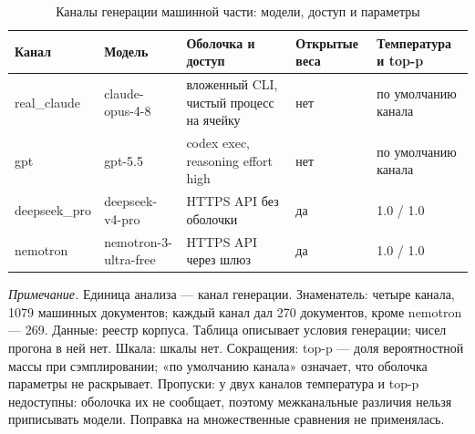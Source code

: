 \begin{table}[htbp]
\centering
\small
\caption{Каналы генерации машинной части: модели, доступ и параметры}
\label{tab:s2}
\begin{tabular}{lllll}
\toprule
Канал & Модель & Оболочка и доступ & Открытые веса & Температура и top-p \\
\midrule
real\_claude & claude-opus-4-8 & вложенный CLI, чистый процесс на ячейку & нет & по умолчанию канала \\
gpt & gpt-5.5 & codex exec, reasoning effort high & нет & по умолчанию канала \\
deepseek\_pro & deepseek-v4-pro & HTTPS API без оболочки & да & 1.0 / 1.0 \\
nemotron & nemotron-3-ultra-free & HTTPS API через шлюз & да & 1.0 / 1.0 \\
\bottomrule
\end{tabular}
\begin{minipage}{\linewidth}\footnotesize\vspace{2pt}
\textit{Примечание.} Единица анализа — канал генерации. Знаменатель: четыре канала, 1079 машинных документов; каждый канал дал 270 документов, кроме nemotron — 269. Данные: реестр корпуса. Таблица описывает условия генерации; чисел прогона в ней нет. Шкала: шкалы нет. Сокращения: top-p — доля вероятностной массы при сэмплировании; «по умолчанию канала» означает, что оболочка параметры не раскрывает. Пропуски: у двух каналов температура и top-p недоступны: оболочка их не сообщает, поэтому межканальные различия нельзя приписывать модели. Поправка на множественные сравнения не применялась.
\end{minipage}
\end{table}
